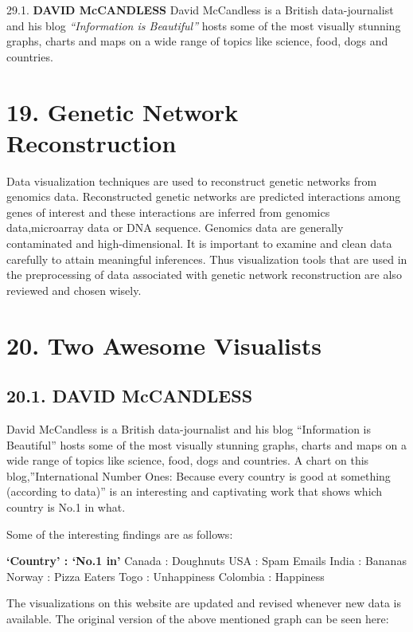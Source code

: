 \documentclass[]{book}
\theoremstyle{definition}
\theoremstyle{definition}
\theoremstyle{definition}
\theoremstyle{remark}
\begin{document}
29.1. \textbf{DAVID McCANDLESS} David McCandless is a British
data-journalist and his blog \emph{``Information is Beautiful''}
\citep{info_beautiful} hosts some of the most visually stunning graphs,
charts and maps on a wide range of topics like science, food, dogs and
countries.

\section{19. Genetic Network
Reconstruction}\label{genetic-network-reconstruction-1}

Data visualization techniques are used to reconstruct genetic networks
from genomics data. Reconstructed genetic networks are predicted
interactions among genes of interest and these interactions are inferred
from genomics data,microarray data or DNA sequence. Genomics data are
generally contaminated and high-dimensional. It is important to examine
and clean data carefully to attain meaningful inferences. Thus
visualization tools that are used in the preprocessing of data
associated with genetic network reconstruction are also reviewed and
chosen wisely.

\section{20. Two Awesome Visualists}\label{two-awesome-visualists-1}

\subsection{20.1. DAVID McCANDLESS}\label{david-mccandless}

David McCandless is a British data-journalist and his blog ``Information
is Beautiful'' \citep{info_beautiful} hosts some of the most visually
stunning graphs, charts and maps on a wide range of topics like science,
food, dogs and countries. A chart on this blog,''International Number
Ones: Because every country is good at something (according to data)''
is an interesting and captivating work that shows which country is No.1
in what. \citep{country_chart}

Some of the interesting findings are as follows:

\textbf{`Country' : `No.1 in' } Canada : Doughnuts USA : Spam Emails
India : Bananas Norway : Pizza Eaters Togo : Unhappiness Colombia :
Happiness

The visualizations on this website are updated and revised whenever new
data is available. The original version of the above mentioned graph can
be seen here: \citep{country_original}
\end{document}
